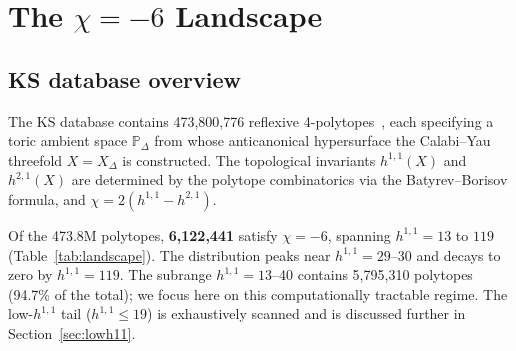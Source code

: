\documentclass[11pt,a4paper]{article}
\newcommand{\bP}{\mathbb{P}}
\begin{document}
\section{The $\chi=-6$ Landscape}
\label{sec:landscape}

\subsection{KS database overview}

The KS database contains 473,800,776 reflexive 4-polytopes~\cite{KS2000},
each specifying a toric ambient space $\bP_\Delta$ from whose
anticanonical hypersurface the Calabi--Yau threefold $X = X_\Delta$
is constructed.
The topological invariants $h^{1,1}(X)$ and $h^{2,1}(X)$ are
determined by the polytope combinatorics via the Batyrev--Borisov
formula, and $\chi = 2(h^{1,1}-h^{2,1})$.

Of the 473.8M polytopes, \textbf{6,122,441} satisfy $\chi=-6$,
spanning $h^{1,1} = 13$ to $119$ (Table~\ref{tab:landscape}).
The distribution peaks near $h^{1,1} = 29$--30 and decays to zero
by $h^{1,1} = 119$.
The subrange $h^{1,1} = 13$--40 contains 5,795,310 polytopes
(94.7\% of the total); we focus here on this computationally
tractable regime.
The low-$h^{1,1}$ tail ($h^{1,1} \leq 19$) is exhaustively
scanned and is discussed further in Section~\ref{sec:lowh11}.
\end{document}
